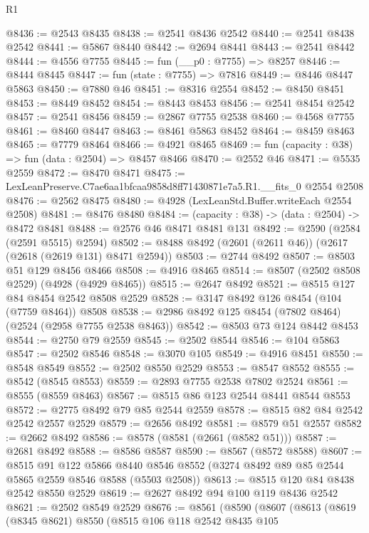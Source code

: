 \begin{lexlean}{R1}
\begin{coremodule}
@8436 := @2543 @8435
@8438 := @2541 @8436 @2542
@8440 := @2541 @8438 @2542
@8441 := @5867 @8440
@8442 := @2694 @8441
@8443 := @2541 @8442
@8444 := @4556 @7755
@8445 := fun (__p0 : @7755) => @8257
@8446 := @8444 @8445
@8447 := fun (state : @7755) => @7816
@8449 := @8446 @8447 @5863
@8450 := @7880 @46
@8451 := @8316 @2554
@8452 := @8450 @8451
@8453 := @8449 @8452
@8454 := @8443 @8453
@8456 := @2541 @8454 @2542
@8457 := @2541 @8456
@8459 := @2867 @7755 @2538
@8460 := @4568 @7755
@8461 := @8460 @8447
@8463 := @8461 @5863 @8452
@8464 := @8459 @8463
@8465 := @7779 @8464
@8466 := @4921 @8465
@8469 := fun (capacity : @38) => fun (data : @2504) => @8457 @8466
@8470 := @2552 @46
@8471 := @5535 @2559
@8472 := @8470 @8471
@8475 := LexLeanPreserve.C7ae6aa1bfcaa9858d8ff71430871e7a5.R1.__fits_0 @2554 @2508
@8476 := @2562 @8475
@8480 := @4928 (LexLeanStd.Buffer.writeEach @2554 @2508)
@8481 := @8476 @8480
@8484 := (capacity : @38) -> (data : @2504) -> @8472 @8481
@8488 := @2576 @46 @8471 @8481 @131
@8492 := @2590 (@2584 (@2591 @5515) @2594)
@8502 := @8488 @8492 (@2601 (@2611 @46)) (@2617 (@2618 (@2619 @131) @8471 @2594))
@8503 := @2744 @8492
@8507 := @8503 @51 @129 @8456 @8466
@8508 := @4916 @8465
@8514 := @8507 (@2502 @8508 @2529) (@4928 (@4929 @8465))
@8515 := @2647 @8492
@8521 := @8515 @127 @84 @8454 @2542 @8508 @2529
@8528 := @3147 @8492 @126 @8454 (@104 (@7759 @8464)) @8508
@8538 := @2986 @8492 @125 @8454 (@7802 @8464) (@2524 (@2958 @7755 @2538 @8463))
@8542 := @8503 @73 @124 @8442 @8453
@8544 := @2750 @79 @2559
@8545 := @2502 @8544
@8546 := @104 @5863
@8547 := @2502 @8546
@8548 := @3070 @105
@8549 := @4916 @8451
@8550 := @8548 @8549
@8552 := @2502 @8550 @2529
@8553 := @8547 @8552
@8555 := @8542 (@8545 @8553)
@8559 := @2893 @7755 @2538 @7802 @2524
@8561 := @8555 (@8559 @8463)
@8567 := @8515 @86 @123 @2544 @8441 @8544 @8553
@8572 := @2775 @8492 @79 @85 @2544 @2559
@8578 := @8515 @82 @84 @2542 @2542 @2557 @2529
@8579 := @2656 @8492
@8581 := @8579 @51 @2557
@8582 := @2662 @8492
@8586 := @8578 (@8581 (@2661 (@8582 @51)))
@8587 := @2681 @8492
@8588 := @8586 @8587
@8590 := @8567 (@8572 @8588)
@8607 := @8515
    @91
    @122
    @5866
    @8440
    @8546
    @8552
    (@3274 @8492 @89 @85 @2544 @5865 @2559 @8546 @8588 (@5503 @2508))
@8613 := @8515 @120 @84 @8438 @2542 @8550 @2529
@8619 := @2627 @8492 @94 @100 @119 @8436 @2542
@8621 := @2502 @8549 @2529
@8676 := @8561
    (@8590
      (@8607
        (@8613
          (@8619
            (@8345 @8621)
            @8550
            (@8515
              @106
              @118
              @2542
              @8435
              @105

\end{coremodule}
\end{lexlean}
